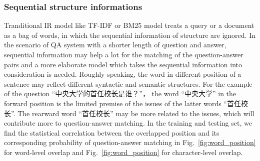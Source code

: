 \documentclass{llncs}
\begin{document}
\subsubsection{Sequential structure informations}

Tranditional IR model like TF-IDF or BM25 model treats a query or a document as a bag of words, in which the sequential information of structure are ignored. In the scenario of QA system with a shorter length of question and answer, sequential information may help a lot for the matching of the question-answer pairs and a more elaborate model which takes the sequential information into consideration is needed. Roughly speaking, the word in different {\color{red}position} of a sentence may reflect different syntactic and semantic structures. For the example of the question ``中央大学的首任校长是谁？''， the word ``中央大学'' in the forward position is the limited premise of the issues of the latter words ``首任校长''.  The rearward word ``首任校长'' may be more related to the issues, which will contribute more to question-answer matching. In the training and testing set, we find the statistical correlation between the overlapped position and its corresponding probability of question-answer matching in Fig.~\ref{fig:word_position} for word-level overlap and Fig.~\ref{fig:word_position} for character-level overlap. 
\end{document}

